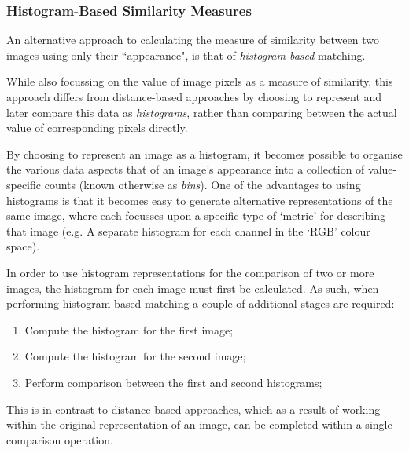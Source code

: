 %
%

\subsubsection{Histogram-Based Similarity Measures}

An alternative approach to calculating the measure of similarity between two images using only their ``appearance", is that of \textit{histogram-based} matching.

While also focussing on the value of image pixels as a measure of similarity, this approach differs from distance-based approaches by choosing to represent and later compare this data as \textit{histograms}, rather than comparing between the actual value of corresponding pixels directly.

By choosing to represent an image as a histogram, it becomes possible to organise the various data aspects that of an image's appearance into a collection of value-specific counts (known otherwise as \textit{bins}). One of the advantages to using histograms is that it becomes easy to generate alternative representations of the same image, where each focusses upon a specific type of `metric' for describing that image (e.g. A separate histogram for each channel in the `RGB' colour space). 

In order to use histogram representations for the comparison of two or more images, the histogram for each image must first be calculated. As such, when performing histogram-based matching a couple of additional stages are required:

\begin{enumerate}
	\item Compute the histogram for the first image;
	\item Compute the histogram for the second image;
	\item Perform comparison between the first and second histograms;
\end{enumerate}

This is in contrast to distance-based approaches, which as a result of working within the original representation of an image, can be completed within a single comparison operation. 

